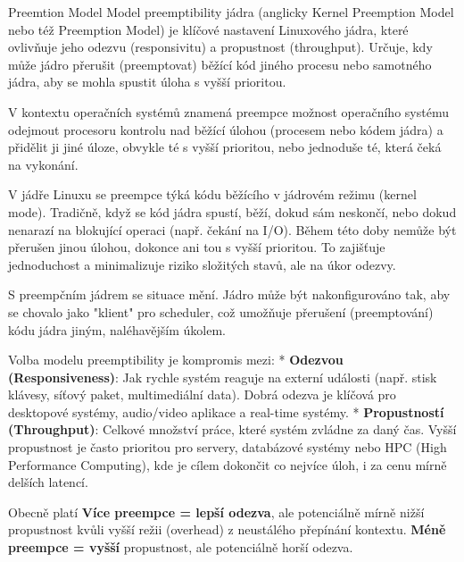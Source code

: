 \secc Preemtion Model
Model preemptibility jádra (anglicky Kernel Preemption Model nebo též Preemption Model) je klíčové nastavení Linuxového jádra, které ovlivňuje jeho odezvu (responsivitu) a propustnost (throughput). Určuje, kdy může jádro přerušit (preemptovat) běžící kód jiného procesu nebo samotného jádra, aby se mohla spustit úloha s vyšší prioritou.

V kontextu operačních systémů znamená preempce možnost operačního systému odejmout procesoru kontrolu nad běžící úlohou (procesem nebo kódem jádra) a přidělit ji jiné úloze, obvykle té s vyšší prioritou, nebo jednoduše té, která čeká na vykonání.

V jádře Linuxu se preempce týká kódu běžícího v jádrovém režimu (kernel mode). Tradičně, když se kód jádra spustí, běží, dokud sám neskončí, nebo dokud nenarazí na blokující operaci (např. čekání na I/O). Během této doby nemůže být přerušen jinou úlohou, dokonce ani tou s vyšší prioritou. To zajišťuje jednoduchost a minimalizuje riziko složitých stavů, ale na úkor odezvy.

S preempčním jádrem se situace mění. Jádro může být nakonfigurováno tak, aby se chovalo jako "klient" pro scheduler, což umožňuje přerušení (preemptování) kódu jádra jiným, naléhavějším úkolem.

Volba modelu preemptibility je kompromis mezi:
\begitems
* {\bf Odezvou (Responsiveness)}: Jak rychle systém reaguje na externí události (např. stisk klávesy, síťový paket, multimediální data). Dobrá odezva je klíčová pro desktopové systémy, audio/video aplikace a real-time systémy.
* {\bf Propustností (Throughput)}: Celkové množství práce, které systém zvládne za daný čas. Vyšší propustnost je často prioritou pro servery, databázové systémy nebo HPC (High Performance Computing), kde je cílem dokončit co nejvíce úloh, i za cenu mírně delších latencí.
\enditems

Obecně platí {\bf Více preempce = lepší odezva}, ale potenciálně mírně nižší propustnost kvůli vyšší režii (overhead) z neustálého přepínání kontextu. {\bf Méně preempce = vyšší} propustnost, ale potenciálně horší odezva.

